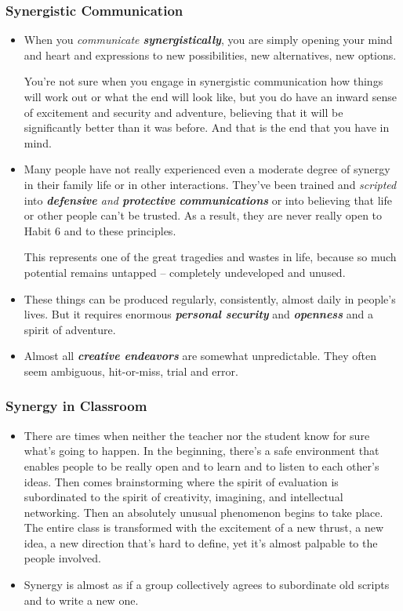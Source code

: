 \documentclass[11pt]{article}
\begin{document}
\subsubsection{Synergistic Communication}
\begin{itemize}
\item When you \emph{communicate \textbf{synergistically}}, you are simply opening your mind and heart and expressions to new possibilities, new alternatives, new options.

You're not sure when you engage in synergistic communication how things will work out or what the end will look like, but you do have an inward sense of excitement and security and adventure, believing that it will be significantly better than it was before. And that is the end that you have in mind.

\item Many people have not really experienced even a moderate degree of synergy in their family life or in other interactions. They've been trained and \emph{scripted} into \emph{\textbf{defensive} and \textbf{protective} \textbf{communications}} or into believing that life or other people can't be trusted. As a result, they are never really open to Habit 6 and to these principles.

This represents one of the great tragedies and wastes in life, because so much potential remains untapped -- completely undeveloped and unused.

\item These things can be produced regularly, consistently, almost daily in people's lives. But it requires enormous \emph{\textbf{personal security}} and \emph{\textbf{openness}} and a spirit of adventure.

\item Almost all \emph{\textbf{creative endeavors}} are somewhat unpredictable. They often seem ambiguous, hit-or-miss, trial and error. 
\end{itemize}
\subsubsection{Synergy in Classroom}
\begin{itemize}
\item There are times when neither the teacher nor the student know for sure what's going to happen. In the beginning, there's a safe environment that enables people to be really open and to learn and to listen to each other's ideas. Then comes brainstorming where the spirit of evaluation is subordinated to the spirit of creativity, imagining, and intellectual networking. Then an absolutely unusual phenomenon begins to take place. The entire class is transformed with the excitement of a new thrust, a new idea, a new direction that's hard to define, yet it's almost palpable to the people involved.
\item Synergy is almost as if a group collectively agrees to subordinate old scripts and to write a new one.
\end{itemize}
\end{document}
